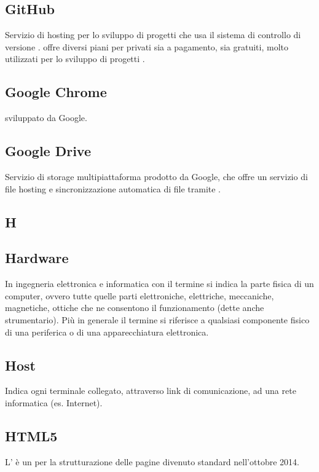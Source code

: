 \subsection*{GitHub}
Servizio  di hosting per lo sviluppo di progetti  che usa il sistema di controllo
di versione  .  offre diversi piani per  privati sia a pagamento, sia
gratuiti, molto utilizzati per lo sviluppo di progetti .

\subsection*{Google Chrome}
  sviluppato da Google.

\subsection*{Google Drive}
Servizio di  storage multipiattaforma prodotto da Google, che offre un servizio di file hosting e
sincronizzazione automatica di file tramite .

\newpage

\begin{center}
\Huge\section*{\uppercase{H}}
\end{center}

\subsection*{Hardware}
In ingegneria elettronica e informatica con il termine  si indica la parte fisica
di un computer, ovvero tutte quelle parti elettroniche, elettriche, meccaniche, magnetiche,
ottiche che ne consentono il funzionamento (dette anche strumentario). Più in generale il
termine si riferisce a qualsiasi componente fisico di una periferica o di una apparecchiatura
elettronica.

\subsection*{Host}
Indica ogni terminale collegato, attraverso link di comunicazione, ad una rete informatica (es. Internet).

\subsection*{HTML5}
L' è un  per la strutturazione delle pagine  divenuto
standard  nell'ottobre 2014.


